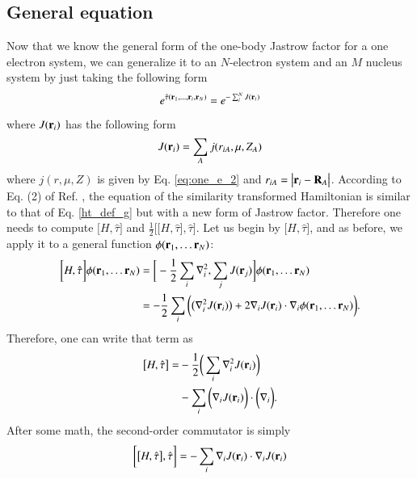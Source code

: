 \documentclass[aip,jcp,reprint,noshowkeys,superscriptaddress]{revtex4-1}
\newcommand{\br}[0]{{\bf {r}}}
\begin{document}
\subsection{General equation}
Now that we know the general form of the one-body Jastrow factor for a one electron system, we can generalize it 
to an $N$-electron system and an $M$ nucleus system by just taking the following form 
\begin{equation}
 e^{\hat{\tau}({\bf r}_1,\hdots , {\bf r}_i,{\bf r}_N)} = e^{-\sum_i^N J({\bf r}_i)} 
\end{equation}
where $J({\bf r}_i)$ has the following form 
\begin{equation}
 J({\bf r}_i) = \sum_{A} j(r_{iA},\mu,Z_A) 
\end{equation}
where $j(r,\mu,Z)$ is given by Eq. \eqref{eq:one_e_2} and $r_{iA} = \big|{\bf r}_i - {\bf R}_A \big|$. 
According to Eq. (2) of Ref. , the equation of the similarity transformed Hamiltonian is similar  
to that of Eq. \eqref{ht_def_g} but with a new form of Jastrow factor. 
Therefore one needs to compute $\big[ H,\hat{\tau} \big]$ and $\frac{1}{2}\bigg[ \big[H,\hat{\tau}\big],\hat{\tau}\bigg]$. 
Let us begin by $\big[ H,\hat{\tau} \big]$, and as before, we apply it to a general function $\phi(\br{}_1,\hdots \br{}_N)$:
\begin{equation}
 \label{eq:one_com1_1}
 \begin{aligned}
 \bigg[ H, \hat{\tau} \bigg]\phi(\br{}_1,\hdots \br{}_N) & = \bigg[ -\frac{1}{2} \sum_i \nabla^2_i, \sum_{j} J(\br{}_j) \bigg]      \phi(\br{}_1,\hdots \br{}_N) \\    
                                                        & = -\frac{1}{2} \sum_i \bigg( \big(\nabla^2_i J({\bf r}_i)\big) + 2\nabla_i J({\bf r}_i) \cdot \nabla_i \phi(\br{}_1,\hdots \br{}_N) \bigg).  
 \end{aligned}
\end{equation}
Therefore, one can write that term as
\begin{equation}
 \label{eq:one_com1_2}
 \begin{aligned}
  \big[ H,\hat{\tau} \big] =& -\frac{1}{2} \bigg( \sum_i \nabla^2_i J(\br{}_i) \bigg) \\
                            & -\sum_i \bigg(\nabla_i J(\br{}_i) \bigg) \cdot \bigg( \nabla_i  \bigg).
 \end{aligned}
\end{equation}
After some math, the second-order commutator is simply 
\begin{equation}
 \bigg[ \big[H,\hat{\tau}\big],\hat{\tau}\bigg] = -\sum_i \nabla_i J({\bf r}_i) \cdot \nabla_i J({\bf r}_i) 
\end{equation}
\end{document}
